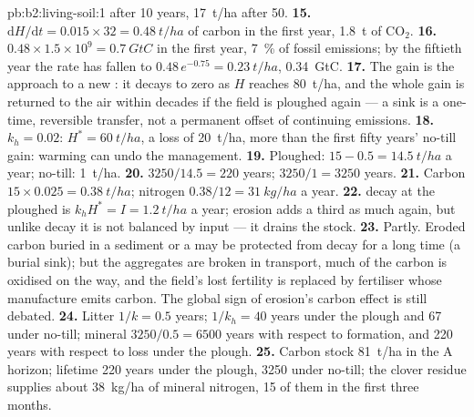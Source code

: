 \begin{solution}{pb:b2:living-soil:1}
after 10 years, \qty{17}{t/ha} after 50.
\textbf{15.} $\mathrm{d}H/\mathrm{d}t = 0.015\times 32 =
\qty{0.48}{t/ha}$ of carbon in the first year, \qty{1.8}{t} of
$\mathrm{CO_2}$.
\textbf{16.} $0.48\times 1.5\times 10^{9} = \qty{0.7}{GtC}$ in the
first year, \qty{7}{\%} of fossil emissions; by the fiftieth year
the rate has fallen to $0.48\,e^{-0.75} = \qty{0.23}{t/ha}$,
\qty{0.34}{GtC}.
\textbf{17.} The gain is the approach to a new : it
decays to zero as $H$ reaches \qty{80}{t/ha}, and the whole gain is
returned to the air within decades if the field is ploughed again
--- a  sink is a one-time, reversible transfer, not a permanent
offset of continuing emissions.
\textbf{18.} $k_h = 0.02$: $H^{*} = \qty{60}{t/ha}$, a loss of
\qty{20}{t/ha}, more than the first fifty years' no-till gain:
warming can undo the
management.
\textbf{19.} Ploughed: $15 - 0.5 = \qty{14.5}{t/ha}$ a year; no-till:
\qty{1}{t/ha}.
\textbf{20.} $3250/14.5 = 220$ years; $3250/1 = 3250$ years.
\textbf{21.} Carbon $15\times 0.025 = \qty{0.38}{t/ha}$; nitrogen
$0.38/12 = \qty{31}{kg/ha}$ a year.
\textbf{22.}  decay at the ploughed  is $k_hH^{*} =
I = \qty{1.2}{t/ha}$ a year; erosion adds a third as much again,
but unlike decay it is not balanced by input --- it drains the
stock.
\textbf{23.} Partly. Eroded carbon buried in a sediment or a
 may be protected from decay for a long time (a burial
sink); but the aggregates are broken in transport, much of the
carbon is oxidised on the way, and the field's lost fertility is
replaced by fertiliser whose manufacture emits carbon. The global
sign of erosion's carbon effect is still debated.
\textbf{24.} Litter $1/k = 0.5$ years;  $1/k_h = 40$ years
under the plough and 67 under no-till; mineral  $3250/0.5 =
6500$ years with respect to formation, and 220 years with respect
to loss under the plough.
\textbf{25.} Carbon stock \qty{81}{t/ha} in the A horizon; lifetime
220 years under the plough, 3250 under no-till; the clover residue
supplies about \qty{38}{kg/ha} of mineral nitrogen, 15 of them in
the first three months.
\end{solution}
